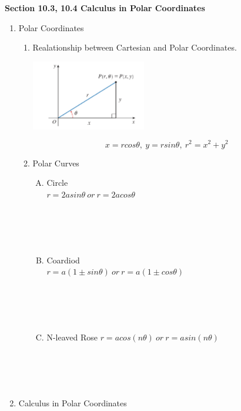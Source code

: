 \documentclass[12px]{article}
\begin{document}
\begin{center}
    \Large\textbf{Section 10.3, 10.4 Calculus in Polar Coordinates}
\end{center}
\begin{enumerate}
    \item Polar Coordinates
    \begin{enumerate}[(1)]
        \item Realationship between 
        Cartesian and Polar Coordinates.
        \begin{center}
            \includegraphics[width=5cm]{PolarCoordinates.png}
        \end{center}
        $$x=rcos\theta,\ y=rsin\theta,\ r^2=x^2+y^2$$
        \item Polar Curves
        \begin{enumerate}[A.]
            \item Circle\\
            $r=2asin\theta\ or\ r=2acos\theta$\\
            \\
            \\
            \\
            \\
            \item Coardiod\\
            $r=a(1\pm sin\theta)\ or\ r=a(1\pm cos\theta)$\\
            \\
            \\
            \\
            \\
            \item N-leaved Rose
            $r=acos(n\theta)\ or\ r=asin(n\theta)$\\
            \\
            \\
            \\
            \\
        \end{enumerate}
    \end{enumerate}
    \item Calculus in Polar Coordinates\\

\end{enumerate}
\end{document}
